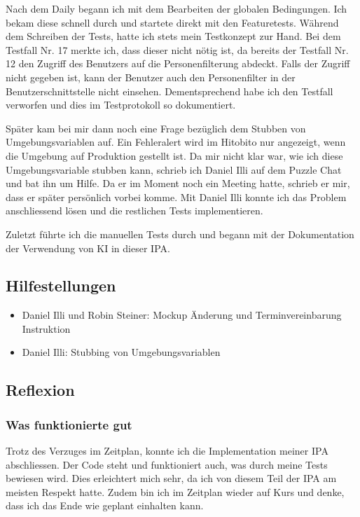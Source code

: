 Nach dem Daily begann ich mit dem Bearbeiten der globalen Bedingungen. Ich bekam diese schnell durch und startete direkt mit den Featuretests.
Während dem Schreiben der Tests, hatte ich stets mein Testkonzept zur Hand. Bei dem Testfall Nr. 17 merkte ich, dass dieser nicht nötig ist, da bereits der Testfall Nr. 12
den Zugriff des Benutzers auf die Personenfilterung abdeckt. Falls der Zugriff nicht gegeben ist, kann der Benutzer auch den Personenfilter in der Benutzerschnittstelle nicht einsehen.
Dementsprechend habe ich den Testfall verworfen und dies im Testprotokoll so dokumentiert. 

Später kam bei mir dann noch eine Frage bezüglich dem Stubben von Umgebungsvariablen auf. Ein Fehleralert wird im Hitobito nur angezeigt,
wenn die Umgebung auf Produktion gestellt ist. Da mir nicht klar war, wie ich diese Umgebungsvariable stubben kann, schrieb ich Daniel Illi auf dem Puzzle Chat und bat ihn um 
Hilfe. Da er im Moment noch ein Meeting hatte, schrieb er mir, dass er später persönlich vorbei komme. Mit Daniel Illi konnte ich das Problem anschliessend lösen und 
die restlichen Tests implementieren.

Zuletzt führte ich die manuellen Tests durch und begann mit der Dokumentation der Verwendung von KI in dieser IPA.

\subsection*{Hilfestellungen}
\begin{itemize}
    \item Daniel Illi und Robin Steiner: Mockup Änderung und Terminvereinbarung Instruktion
    \item Daniel Illi: Stubbing von Umgebungsvariablen
\end{itemize}

\subsection*{Reflexion}

\subsubsection*{Was funktionierte gut}
Trotz des Verzuges im Zeitplan, konnte ich die Implementation meiner IPA abschliessen. Der Code steht und funktioniert auch, was durch meine
Tests bewiesen wird. Dies erleichtert mich sehr, da ich von diesem Teil der IPA am meisten Respekt hatte. Zudem bin ich im Zeitplan wieder auf Kurs
und denke, dass ich das Ende wie geplant einhalten kann. 

